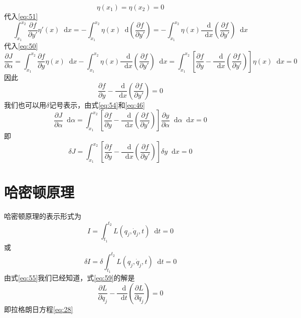 \documentclass{article}
\newcommand*{\dif}{\mathop{}\!\mathrm{d}}
\begin{document}
 \begin{equation}
   \label{eq:52}
    \eta (x_{1}) = \eta (x_{2}) = 0
  \end{equation}
代入\ref{eq:51}
 \begin{equation}
   \label{eq:53}
   \int_{x_{1}}^{x_{2}} \frac{\partial f}{\partial y'} \eta'(x) \dif x = - \int_{x_{1}}^{x_{2}} \eta (x) \dif \left( \frac{\partial f}{\partial y'} \right) = - \int_{x_{1}}^{x_{2}} \eta (x) \frac{\dif}{\dif x} \left( \frac{\partial f}{\partial y'} \right) \dif x
 \end{equation}
 代入\ref{eq:50}
 \begin{equation}
   \label{eq:54}
   \frac{\partial J}{\partial \alpha} = \int_{x_{1}}^{x_{2}} \frac{\partial f}{\partial y} \eta (x) \dif x - \int_{x_{1}}^{x_{2}} \eta (x) \frac{\dif}{\dif x} \left( \frac{\partial f}{\partial y'} \right) \dif x = \int_{x_{1}}^{x_{2}} \left[ \frac{\partial f}{\partial y} -  \frac{\dif}{\dif x} \left( \frac{\partial f}{\partial y'} \right) \right]\eta (x) \dif x = 0
\end{equation}
 因此
\begin{equation}
   \label{eq:55}
   \frac{\partial f}{\partial y} -  \frac{\dif}{\dif x} \left( \frac{\partial f}{\partial y'} \right) = 0
 \end{equation}
 我们也可以用$\delta$记号表示，由式\ref{eq:54}和\ref{eq:46}
 \begin{equation}
   \label{eq:56}
    \frac{\partial J}{\partial \alpha} \dif \alpha = \int_{x_{1}}^{x_{2}} \left[ \frac{\partial f}{\partial y} -  \frac{\dif}{\dif x} \left( \frac{\partial f}{\partial y'} \right) \right] \frac{\partial y}{\partial \alpha} \dif \alpha \dif x = 0
  \end{equation}
  即
  \begin{equation}
    \label{eq:57}
    \delta J = \int_{x_{1}}^{x_{2}} \left[ \frac{\partial f}{\partial y} -  \frac{\dif}{\dif x} \left( \frac{\partial f}{\partial y'} \right) \right] \delta  y \dif x = 0
  \end{equation}

  \section{哈密顿原理}

  哈密顿原理的表示形式为
  \begin{equation}
    \label{eq:58}
    I = \int_{t_{1}}^{t_{2}} L \left( q_{j},\dot{q}_{j},t \right) \dif t= 0
  \end{equation}
  或
  \begin{equation}
    \label{eq:59}
    \delta I = \delta \int_{t_{1}}^{t_{2}} L \left( q_{j},\dot{q}_{j},t \right) \dif t= 0
  \end{equation}
  由式\ref{eq:55}我们已经知道，式\ref{eq:59}的解是
  \begin{equation}
    \label{eq:60}
    \frac{\partial L}{\partial q_{j}} -  \frac{\dif}{\dif t} \left( \frac{\partial L}{\partial \dot{q}_{j}} \right) = 0
  \end{equation}
  即拉格朗日方程\ref{eq:28}
\end{document}
